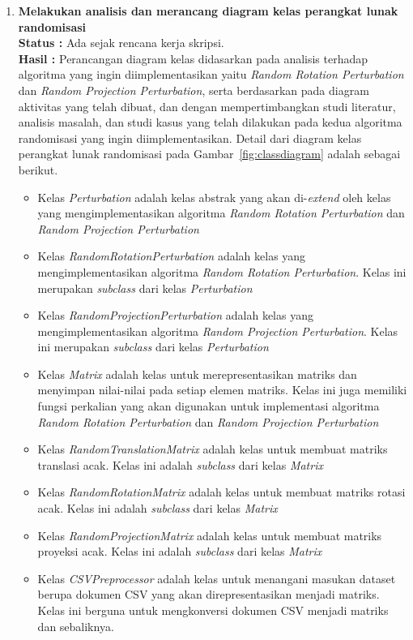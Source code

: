 \documentclass[a4paper,twoside]{article}
\begin{document}
\begin{enumerate}
		\item \textbf{Melakukan analisis dan merancang diagram kelas perangkat lunak randomisasi}\\
		{\bf Status :} Ada sejak rencana kerja skripsi.\\
		{\bf Hasil :} Perancangan diagram kelas didasarkan pada analisis terhadap algoritma yang ingin diimplementasikan yaitu \textit{Random Rotation Perturbation} dan \textit{Random Projection Perturbation}, serta berdasarkan pada diagram aktivitas yang telah dibuat, dan dengan mempertimbangkan studi literatur, analisis masalah, dan studi kasus yang telah dilakukan pada kedua algoritma randomisasi yang ingin diimplementasikan. Detail dari diagram kelas perangkat lunak randomisasi pada Gambar~\ref{fig:classdiagram} adalah sebagai berikut.
		\begin{itemize}
			\item Kelas \textit{Perturbation} adalah kelas abstrak yang akan di-\textit{extend} oleh kelas yang mengimplementasikan algoritma \textit{Random Rotation Perturbation} dan \textit{Random Projection Perturbation}
			\item Kelas \textit{RandomRotationPerturbation} adalah kelas yang mengimplementasikan algoritma \textit{Random Rotation Perturbation}. Kelas ini merupakan \textit{subclass} dari kelas \textit{Perturbation}
			\item Kelas \textit{RandomProjectionPerturbation} adalah kelas yang mengimplementasikan algoritma \textit{Random Projection Perturbation}. Kelas ini merupakan \textit{subclass} dari kelas \textit{Perturbation}
			\item Kelas \textit{Matrix} adalah kelas untuk merepresentasikan matriks dan menyimpan nilai-nilai pada setiap elemen matriks. Kelas ini juga memiliki fungsi perkalian yang akan digunakan untuk implementasi algoritma \textit{Random Rotation Perturbation} dan \textit{Random Projection Perturbation}
			\item Kelas \textit{RandomTranslationMatrix} adalah kelas untuk membuat matriks translasi acak. Kelas ini adalah \textit{subclass} dari kelas \textit{Matrix}
			\item Kelas \textit{RandomRotationMatrix} adalah kelas untuk membuat matriks rotasi acak. Kelas ini adalah \textit{subclass} dari kelas \textit{Matrix}
			\item Kelas \textit{RandomProjectionMatrix} adalah kelas untuk membuat matriks proyeksi acak. Kelas ini adalah \textit{subclass} dari kelas \textit{Matrix}
			\item Kelas \textit{CSVPreprocessor} adalah kelas untuk menangani masukan dataset berupa dokumen CSV yang akan direpresentasikan menjadi matriks. Kelas ini berguna untuk mengkonversi dokumen CSV menjadi matriks dan sebaliknya.
		\end{itemize}
		

\end{enumerate}
\end{document}
